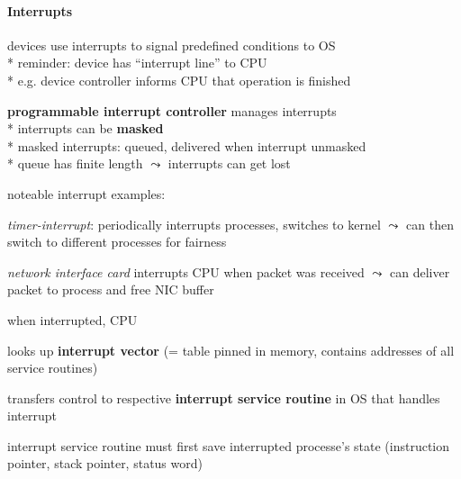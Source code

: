 \paragraph{Interrupts}
\begin{items}
	\item devices use interrupts to signal predefined conditions to OS \\*
		reminder: device has "`interrupt line"' to CPU \\*
		e.g. device controller informs CPU that operation is finished
	\item \textbf{programmable interrupt controller} manages interrupts \\*
		interrupts can be \textbf{masked} \\*
		masked interrupts: queued, delivered when interrupt unmasked \\*
		queue has finite length \( \leadsto \) interrupts can get lost
	\item noteable interrupt examples:
	\begin{enumeration}
		\item \emph{timer-interrupt}: periodically interrupts processes, switches to kernel \( \leadsto \) can then switch to different processes for fairness
		\item \emph{network interface card} interrupts CPU when packet was received \( \leadsto \) can deliver packet to process and free NIC buffer
	\end{enumeration}
	\item when interrupted, CPU
	\begin{enumeration}
		\item looks up \textbf{interrupt vector} (= table pinned in memory, contains addresses of all service routines)
		\item transfers control to respective \textbf{interrupt service routine} in OS that handles interrupt
	\end{enumeration}
	\item interrupt service routine must first save interrupted processe's state (instruction pointer, stack pointer, status word)
\end{items}

